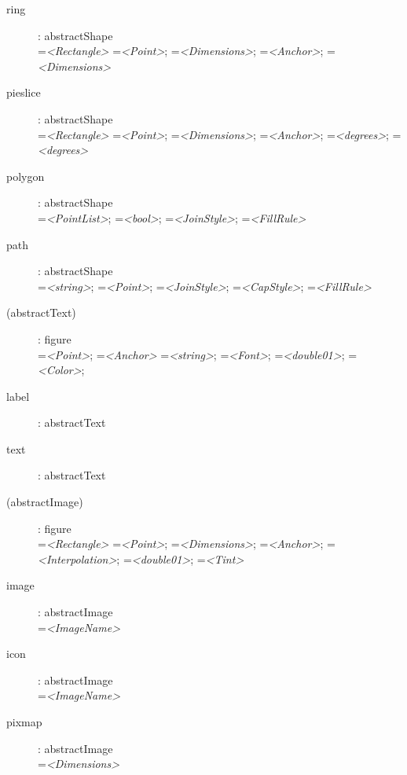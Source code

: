 \begin{flushleft}
\begin{description}
\item[ring]: abstractShape \\
    =\textit{<Rectangle>}
    =\textit{<Point>};
    =\textit{<Dimensions>};
    =\textit{<Anchor>};
    =\textit{<Dimensions>}

\item[pieslice]: abstractShape \\
    =\textit{<Rectangle>}
    =\textit{<Point>};
    =\textit{<Dimensions>};
    =\textit{<Anchor>};
    =\textit{<degrees>};
    =\textit{<degrees>}

\item[polygon]: abstractShape \\
    =\textit{<PointList>};
    =\textit{<bool>};
    =\textit{<JoinStyle>};
    =\textit{<FillRule>}

\item[path]: abstractShape \\
    =\textit{<string>};
    =\textit{<Point>};
    =\textit{<JoinStyle>};
    =\textit{<CapStyle>};
    =\textit{<FillRule>}

\item[(abstractText)]: figure \\
    =\textit{<Point>};
    =\textit{<Anchor>}
    =\textit{<string>};
    =\textit{<Font>};
    =\textit{<double01>};
    =\textit{<Color>};

\item[label]: abstractText

\item[text]: abstractText

\item[(abstractImage)]: figure \\
    =\textit{<Rectangle>}
    =\textit{<Point>};
    =\textit{<Dimensions>};
    =\textit{<Anchor>};
    =\textit{<Interpolation>};
    =\textit{<double01>};
    =\textit{<Tint>}

\item[image]: abstractImage \\
    =\textit{<ImageName>}

\item[icon]: abstractImage \\
    =\textit{<ImageName>}

\item[pixmap]: abstractImage \\
    =\textit{<Dimensions>}

\end{description}
\end{flushleft}






















